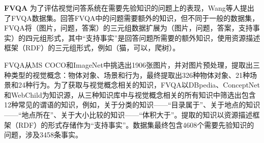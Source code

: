 \textbf{FVQA}\qquad
为了评估视觉问答系统在需要先验知识的问题上的表现，Wang等人提出了FVQA数据集。回答FVQA中的问题需要额外的知识，但不同于一般的数据集，FVQA将（图片，问题，答案）的三元组数据扩展为（图片，问题，答案，支持事实）的四元组形式，其中“支持事实”是回答问题所需要的额外知识，使用资源描述框架（RDF）的三元组形式，例如（猫，可以，爬树）。

FVQA从MS COCO和ImageNet中挑选出1906张图片，并对图片预处理，提取出三种类型的视觉概念：物体对象、场景和行为，最终提取出326种物体对象、21种场景和24种行为。为了获取与视觉概念相关的知识，FVQA以DBpedia、ConceptNet和WebChild为知识源，从三种知识库中与视觉概念相关的所有知识中筛选出包含12种常见的谓语的知识，例如，关于分类的知识——“目录属于”、关于地点的知识——“地点所在”、关于大小比较的知识——“体积大于”。提取的知识以资源描述框架（RDF）的形式存储作为“支持事实”。数据集最终包含4608个需要先验知识的问题，涉及3458条事实。




